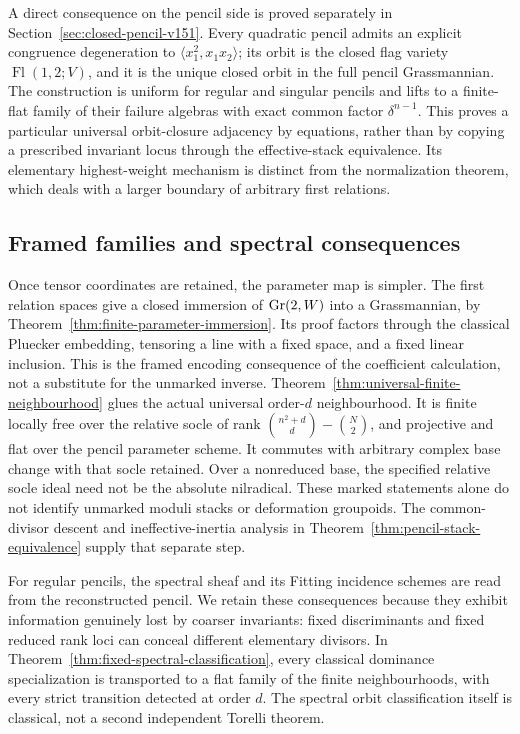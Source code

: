 \documentclass[11pt,reqno]{amsart}
\numberwithin{equation}{section}
\theoremstyle{definition}\newtheorem{definition}[theorem]{Definition}
\theoremstyle{remark}\newtheorem{remark}[theorem]{Remark}
\begin{document}
A direct consequence on the pencil side is proved separately in
Section~\ref{sec:closed-pencil-v151}.  Every quadratic pencil admits
an explicit congruence degeneration to
\(\langle x_1^2,x_1x_2\rangle\); its orbit is the closed flag
variety \(\operatorname{Fl}(1,2;V)\), and it is the unique closed
orbit in the full pencil Grassmannian.  The construction is uniform
for regular and singular pencils and lifts to a finite-flat family
of their failure algebras with exact common factor
\(\delta^{n-1}\).  This proves a particular universal orbit-closure
adjacency by equations, rather than by copying a prescribed invariant
locus through the effective-stack equivalence.  Its elementary
highest-weight mechanism is distinct from the normalization theorem,
which deals with a larger boundary of arbitrary first relations.

\subsection{Framed families and spectral consequences}
Once tensor coordinates are retained, the parameter map is simpler.
The first relation spaces give a closed immersion of
\(\operatorname{Gr}(2,W)\) into a Grassmannian, by
Theorem~\ref{thm:finite-parameter-immersion}.  Its proof factors through
the classical Pluecker embedding, tensoring a line with a fixed space,
and a fixed linear inclusion.  This is the framed encoding consequence
of the coefficient calculation, not a substitute for the unmarked
inverse.  Theorem~\ref{thm:universal-finite-neighbourhood} glues the
actual universal order-\(d\) neighbourhood.  It is finite locally
free over the relative socle of rank
\(\binom{n^2+d}{d}-\binom N2\), and projective and flat over the
pencil parameter scheme.  It commutes with arbitrary complex base
change with that socle retained.  Over a nonreduced base, the specified
relative socle ideal need not be the absolute nilradical.  These marked statements alone do not identify unmarked moduli
stacks or deformation groupoids.  The common-divisor descent and
ineffective-inertia analysis in
Theorem~\ref{thm:pencil-stack-equivalence} supply that separate step.

For regular pencils, the spectral sheaf and its Fitting incidence
schemes are read from the reconstructed pencil.  We retain these
consequences because they exhibit information genuinely lost by
coarser invariants: fixed discriminants and fixed reduced rank loci
can conceal different elementary divisors.  In
Theorem~\ref{thm:fixed-spectral-classification}, every classical
dominance specialization is transported to a flat family of the
finite neighbourhoods, with every strict transition detected at
order \(d\).  The spectral orbit classification itself is classical,
not a second independent Torelli theorem.
\end{document}
